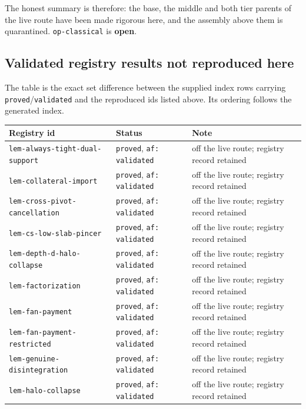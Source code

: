 The honest summary is therefore: the base, the middle and both tier parents of the live
route have been made rigorous here, and the assembly above them is quarantined.
\texttt{op-classical} is \textbf{open}.

\subsection*{Validated registry results not reproduced here}

The table is the exact set difference between the supplied index rows carrying
\texttt{proved}/\texttt{validated} and the reproduced ids listed above. Its ordering
follows the generated index.

\begin{longtable}{@{}p{}p{}p{}@{}}
\toprule
Registry id & Status & Note \\
\midrule
\endhead
\texttt{lem-always-tight-dual-support} & \texttt{proved}, \texttt{af: validated} & off the live route; registry record retained \\
\texttt{lem-collateral-import} & \texttt{proved}, \texttt{af: validated} & off the live route; registry record retained \\
\texttt{lem-cross-pivot-cancellation} & \texttt{proved}, \texttt{af: validated} & off the live route; registry record retained \\
\texttt{lem-cs-low-slab-pincer} & \texttt{proved}, \texttt{af: validated} & off the live route; registry record retained \\
\texttt{lem-depth-d-halo-collapse} & \texttt{proved}, \texttt{af: validated} & off the live route; registry record retained \\
\texttt{lem-factorization} & \texttt{proved}, \texttt{af: validated} & off the live route; registry record retained \\
\texttt{lem-fan-payment} & \texttt{proved}, \texttt{af: validated} & off the live route; registry record retained \\
\texttt{lem-fan-payment-restricted} & \texttt{proved}, \texttt{af: validated} & off the live route; registry record retained \\
\texttt{lem-genuine-disintegration} & \texttt{proved}, \texttt{af: validated} & off the live route; registry record retained \\
\texttt{lem-halo-collapse} & \texttt{proved}, \texttt{af: validated} & off the live route; registry record retained \\

\end{longtable}
